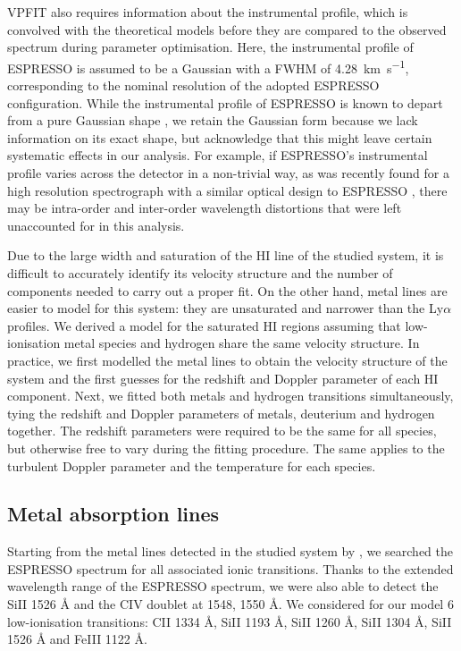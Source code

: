 \documentclass[fleqn,usenatbib]{mnras}
\makeatletter
\DeclareRobustCommand{\ion}[2]{%
  \mbox{#1\check@mathfonts\fontsize\sf@size\z@\selectfont #2}%
}
\DeclareRobustCommand{\kms}[1]{\SI{#1}{\km\per\second}}
\makeatother
\begin{document}
VPFIT also requires information about the instrumental profile, which is convolved with the theoretical models before they are compared to the observed spectrum during parameter optimisation. Here, the instrumental profile of ESPRESSO is assumed to be a Gaussian with a FWHM of \kms{4.28}, corresponding to the nominal resolution of the adopted ESPRESSO configuration. While the instrumental profile of ESPRESSO is known to depart from a pure Gaussian shape \citep{Schmidt_2021,2022arXiv221202458M}, we retain the Gaussian form because we lack information on its exact shape, but acknowledge that this might leave certain systematic effects in our analysis. For example, if ESPRESSO's instrumental profile varies across the detector in a non-trivial way, as was recently found for a high resolution spectrograph with a similar optical design to ESPRESSO \citep{2023arXiv231105240M}, there may be intra-order and inter-order wavelength distortions that were left unaccounted for in this analysis.

Due to the large width and saturation of the \ion{H}{I} line of the studied system, it is difficult to accurately identify its velocity structure and the number of components needed to carry out a proper fit. On the other hand, metal lines are easier to model for this system: they are unsaturated and narrower than the Ly$\alpha$ profiles. We derived a model for the saturated \ion{H}{I} regions assuming that low-ionisation metal species and hydrogen share the same velocity structure. In practice, we first modelled the metal lines to obtain the velocity structure of the system and the first guesses for the redshift and Doppler parameter of each \ion{H}{I} component. Next, we fitted both metals and hydrogen transitions simultaneously, tying the redshift and Doppler parameters of metals, deuterium and hydrogen together. The redshift parameters were required to be the same for all species, but otherwise free to vary during the fitting procedure. The same applies to the turbulent Doppler parameter and the temperature for each species.

\subsection{Metal absorption lines}
Starting from the metal lines detected in the studied system by , we searched the ESPRESSO spectrum for all associated ionic transitions. Thanks to the extended wavelength range of the ESPRESSO spectrum, we were also able to detect the \ion{Si}{II} 1526 \AA{} and the \ion{C}{IV} doublet at 1548, 1550 \AA. 
We considered for our model 6 low-ionisation transitions: \ion{C}{II} 1334 \AA{}, \ion{Si}{II} 1193 \AA{}, \ion{Si}{II} 1260 \AA{}, \ion{Si}{II} 1304 \AA{}, \ion{Si}{II} 1526 \AA{} and \ion{Fe}{III} 1122 \AA. 
\end{document}
